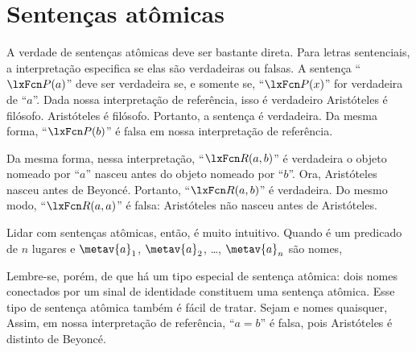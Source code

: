 \section{Sentenças atômicas}
A verdade de sentenças atômicas deve ser bastante direta. Para letras sentenciais, a interpretação especifica se elas são verdadeiras ou falsas. A sentença \textquotedblleft $\atom{P}{a}$\textquotedblright{} deve ser verdadeira se, e somente se, \textquotedblleft $\atom{P}{x}$\textquotedblright{} for verdadeira de \textquotedblleft $a$\textquotedblright{}. Dada nossa interpretação de referência, isso é verdadeiro \ifeff{} Aristóteles é filósofo. Aristóteles é filósofo. Portanto, a sentença é verdadeira. Da mesma forma, \textquotedblleft $\atom{P}{b}$\textquotedblright{} é falsa em nossa interpretação de referência.

Da mesma forma, nessa interpretação, \textquotedblleft $\atom{R}{a,b}$\textquotedblright{} é verdadeira \ifeff{} o objeto nomeado por \textquotedblleft $a$\textquotedblright{} nasceu antes do objeto nomeado por \textquotedblleft $b$\textquotedblright{}. Ora, Aristóteles nasceu antes de Beyonc\'e. Portanto, \textquotedblleft $\atom{R}{a,b}$\textquotedblright{} é verdadeira. Do mesmo modo, \textquotedblleft $\atom{R}{a,a}$\textquotedblright{} é falsa: Aristóteles não nasceu antes de Aristóteles.

Lidar com sentenças atômicas, então, é muito intuitivo. Quando  é um predicado de $n$ lugares e $\metav{a}_1$, $\metav{a}_{2}$, \dots, $\metav{a}_{n}$ são nomes,

Lembre-se, porém, de que há um tipo especial de sentença atômica: dois nomes conectados por um sinal de identidade constituem uma sentença atômica. Esse tipo de sentença atômica também é fácil de tratar. Sejam  e  nomes quaisquer,
Assim, em nossa interpretação de referência, \textquotedblleft $a = b$\textquotedblright{} é falsa, pois Aristóteles é distinto de Beyonc\'e.


